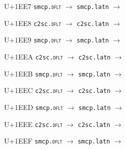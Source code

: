 \documentclass{article}
\begin{document}
\begin{substitutions}
\goodbreak

U+1EE7  \linebreak
    \texttt{smcp.\textsc{dflt}} $\to$  \linebreak
    \texttt{smcp.latn} $\to$  

\goodbreak

U+1EE8  \linebreak
    \texttt{c2sc.\textsc{dflt}} $\to$  \linebreak
    \texttt{c2sc.latn} $\to$  

\goodbreak

U+1EE9  \linebreak
    \texttt{smcp.\textsc{dflt}} $\to$  \linebreak
    \texttt{smcp.latn} $\to$  

\goodbreak

U+1EEA  \linebreak
    \texttt{c2sc.\textsc{dflt}} $\to$  \linebreak
    \texttt{c2sc.latn} $\to$  

\goodbreak

U+1EEB  \linebreak
    \texttt{smcp.\textsc{dflt}} $\to$  \linebreak
    \texttt{smcp.latn} $\to$  

\goodbreak

U+1EEC  \linebreak
    \texttt{c2sc.\textsc{dflt}} $\to$  \linebreak
    \texttt{c2sc.latn} $\to$  

\goodbreak

U+1EED  \linebreak
    \texttt{smcp.\textsc{dflt}} $\to$  \linebreak
    \texttt{smcp.latn} $\to$  

\goodbreak

U+1EEE  \linebreak
    \texttt{c2sc.\textsc{dflt}} $\to$  \linebreak
    \texttt{c2sc.latn} $\to$  

\goodbreak

U+1EEF  \linebreak
    \texttt{smcp.\textsc{dflt}} $\to$  \linebreak
    \texttt{smcp.latn} $\to$  


\end{substitutions}
\end{document}
